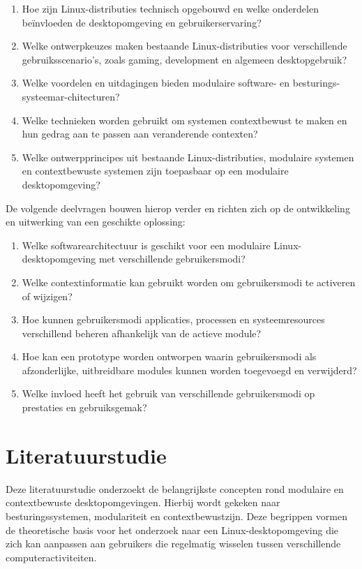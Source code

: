 \documentclass{hogent-article}
\begin{document}
\begin{enumerate}
    \item Hoe zijn Linux-distributies technisch opgebouwd en welke onderdelen beïnvloeden de desktopomgeving en gebruikerservaring?
    \item Welke ontwerpkeuzes maken bestaande Linux-distributies voor verschillende gebruiksscenario's, zoals gaming, development en algemeen desktopgebruik?
    \item Welke voordelen en uitdagingen bieden modulaire software- en besturings-systeemar-chitecturen?
    \item Welke technieken worden gebruikt om systemen contextbewust te maken en hun gedrag aan te passen aan veranderende contexten?
    \item Welke ontwerpprincipes uit bestaande Linux-distributies, modulaire systemen en contextbewuste systemen zijn toepasbaar op een modulaire desktopomgeving?
\end{enumerate}

De volgende deelvragen bouwen hierop verder en richten zich op de ontwikkeling en uitwerking van een geschikte oplossing:

\begin{enumerate}[start=6]
    \item Welke softwarearchitectuur is geschikt voor een modulaire Linux-desktopomgeving met verschillende gebruikersmodi?
    \item Welke contextinformatie kan gebruikt worden om gebruikersmodi te activeren of wijzigen?
    \item Hoe kunnen gebruikersmodi applicaties, processen en systeemresources verschillend beheren afhankelijk van de actieve module?
    \item Hoe kan een prototype worden ontworpen waarin gebruikersmodi als afzonderlijke, uitbreidbare modules kunnen worden toegevoegd en verwijderd?
    \item Welke invloed heeft het gebruik van verschillende gebruikersmodi op prestaties en gebruiksgemak?
\end{enumerate}

\section{Literatuurstudie}%
\label{sec:literatuurstudie}

Deze literatuurstudie onderzoekt de belangrijkste concepten rond modulaire en contextbewuste desktopomgevingen. Hierbij wordt gekeken naar besturingssystemen, modulariteit en contextbewustzijn. Deze begrippen vormen de theoretische basis voor het onderzoek naar een Linux-desktopomgeving die zich kan aanpassen aan gebruikers die regelmatig wisselen tussen verschillende computeractiviteiten.
\end{document}
